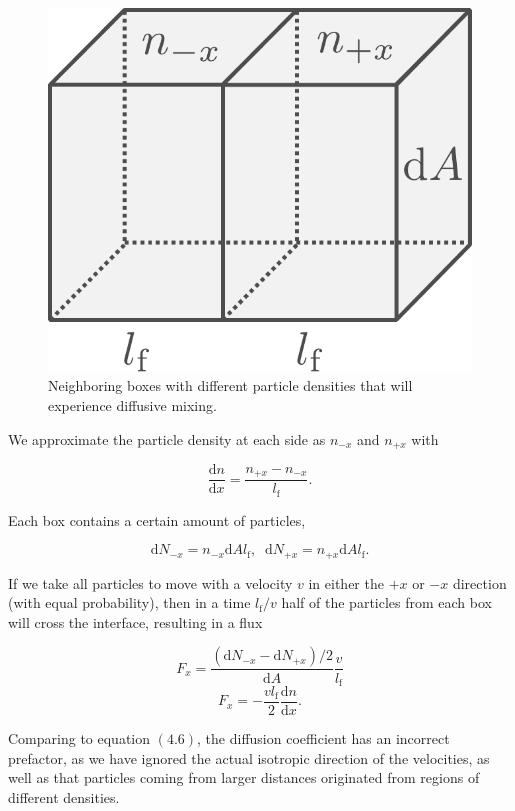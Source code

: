 \documentclass[twocolumn]{article}
\begin{document}
\begin{figure}
\centering
\includegraphics{../assets/5_radiative/diffusion.pdf}
\caption{Neighboring boxes with different particle densities that will
experience diffusive mixing.}
\end{figure}

We approximate the particle density at each side as \(n_{-x}\) and
\(n_{+x}\) with

\[\frac{\mathrm{d}n}{\mathrm{d}x} = \frac{n_{+x}-n_{-x}}{l_\mathrm{f}}.\]

Each box contains a certain amount of particles,

\[\mathrm{d}N_{-x}=n_{-x}\mathrm{d}Al_\mathrm{f},\;\;\mathrm{d}N_{+x}=n_{+x}\mathrm{d}Al_\mathrm{f}.\]

If we take all particles to move with a velocity \(v\) in either the
\(+x\) or \(-x\) direction (with equal probability), then in a time
\(l_\mathrm{f}/v\) half of the particles from each box will cross the
interface, resulting in a flux

\[F_x=\frac{(\mathrm{d}N_{-x}-\mathrm{d}N_{+x})/2}{\mathrm{d}A}\frac{v}{l_\mathrm{f}}\]
\[F_x = -\frac{vl_\mathrm{f}}{2}\frac{\mathrm{d}n}{\mathrm{d}x}.\]

Comparing to equation \((4.6)\), the diffusion coefficient has an
incorrect prefactor, as we have ignored the actual isotropic direction
of the velocities, as well as that particles coming from larger
distances originated from regions of different densities.
\end{document}
